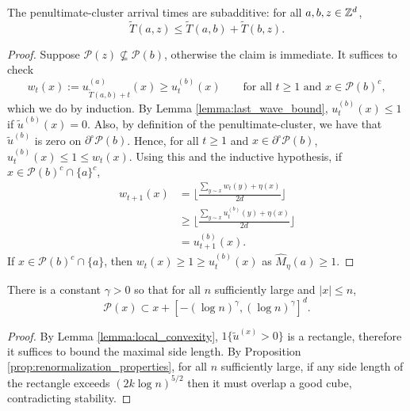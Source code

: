 \documentclass[12pt]{amsart}
\begin{document}
\begin{lemma} \label{lemma:approx_subadditivity}
	The penultimate-cluster arrival times are subadditive: for all $a,b,z \in \mathbb{Z}^d$, 
	\[
	\tilde{T}(a,z) \leq \tilde{T}(a,b) + \tilde{T}(b, z).
	\]	
\end{lemma}
\begin{proof}
	Suppose $\mathcal{P}(z) \not \subseteq \mathcal{P}(b)$, otherwise the claim is immediate.
	It suffices to check  
	\begin{equation}
	w_t(x)  := u_{\tilde{T}(a,b)+t}^{(a)}(x) \geq u_{t}^{(b)}(x) \qquad \mbox{for all $t \geq 1$ and $x \in \mathcal{P}(b)^c$},
	\end{equation}
	which we do by induction. 
	By Lemma \ref{lemma:last_wave_bound}, $u_t^{(b)}(x) \leq 1$ if $\tilde{u}^{(b)}(x) = 0$. 
	Also, by definition of the penultimate-cluster, we have that $\tilde u^{(b)}$  is zero 
	on $\partial^{\circ} \mathcal{P}(b)$.
	Hence, for all $t \geq 1$ and $x \in \partial^{\circ} \mathcal{P}(b)$,  $u_t^{(b)}(x) \leq 1 \leq w_t(x)$.
	Using this and the inductive hypothesis, if $x \in \mathcal{P}(b)^c \cap \{a\}^c$, 
	\begin{align*}
	w_{t+1}(x) &= \lfloor \frac{ \sum_{y \sim x} w_t(y) + \eta(x) }{ 2d} \rfloor \\
	&\geq  \lfloor \frac{ \sum_{y \sim x} u_{t}^{(b)}(y) + \eta(x) }{ 2d} \rfloor \\
	&=  u_{t+1}^{(b)}(x).
	\end{align*}
	If $x \in \mathcal{P}(b)^c \cap \{a\}$, then $w_t(x) \geq 1 \geq u_t^{(b)}(x)$ as $\hat{M}_{\eta}(a) \geq 1$. 
	
	
	
	
\end{proof}



\begin{lemma} \label{lemma:last_penultimate_cluster}
	There is a constant $\gamma > 0$ so that for all $n$ sufficiently large 
	and $|x| \leq n$, 
	\[
	\mathcal{P}(x) \subset x + [-(\log n)^{\gamma}, (\log n)^{\gamma}]^d.
	\]	
\end{lemma}
\begin{proof}
	By Lemma \ref{lemma:local_convexity}, $1\{ \tilde{u}^{(x)} > 0 \}$ is a rectangle,
	therefore it suffices to bound the maximal side length. By Proposition \ref{prop:renormalization_properties},
	for all $n$ sufficiently large, if any side length of the rectangle exceeds  $(2 k \log n)^{5/2}$ then it
	must overlap a good cube, contradicting stability. 
\end{proof}
\end{document}
